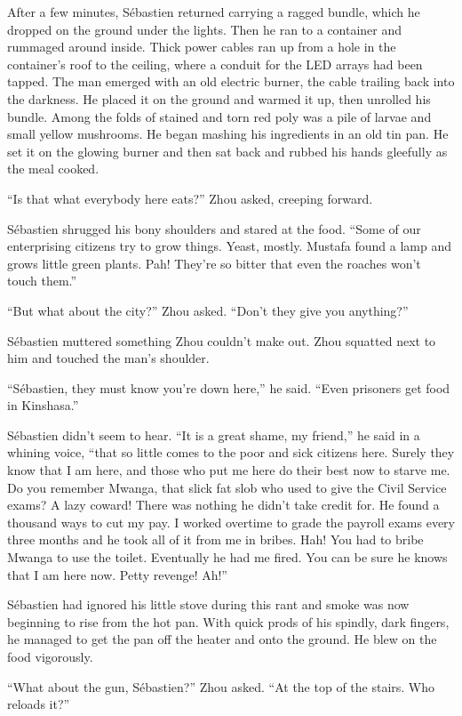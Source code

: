 \documentclass[10pt,a4paper]{article}
\begin{document}
After a few minutes, S\'{e}bastien returned carrying a ragged bundle,
which he dropped on the ground under the lights. Then he ran to a
container and rummaged around inside. Thick power cables ran up from
a hole in the container's roof to the ceiling, where a conduit for
the LED arrays had been tapped. The man emerged with an old electric
burner, the cable trailing back into the darkness. He placed it
on the ground and warmed it up, then unrolled his bundle. Among
the folds of stained and torn red poly was a pile of larvae and
small yellow mushrooms. He began mashing his ingredients in an
old tin pan. He set it on the glowing burner and then sat back
and rubbed his hands gleefully as the meal cooked.

``Is that what everybody here eats?'' Zhou asked, creeping forward.

S\'{e}bastien shrugged his bony shoulders and stared at
the food. ``Some of our enterprising citizens try to grow
things. Yeast, mostly. Mustafa found a lamp and grows little green
plants. Pah! They're so bitter that even the roaches won't touch
them.''

``But what about the city?'' Zhou asked. ``Don't they give you
anything?''

S\'{e}bastien muttered something Zhou couldn't make out. Zhou squatted
next to him and touched the man's shoulder.

``S\'{e}bastien, they must know you're down here,'' he said. ``Even
prisoners get food in Kinshasa.''

S\'{e}bastien didn't seem to hear. ``It is a great shame, my friend,''
he said in a whining voice, ``that so little comes to the poor and
sick citizens here. Surely they know that I am here, and those
who put me here do their best now to starve me. Do you remember
Mwanga, that slick fat slob who used to give the Civil Service
exams? A lazy coward! There was nothing he didn't take credit
for. He found a thousand ways to cut my pay. I worked overtime
to grade the payroll exams every three months and he took all of
it from me in bribes. Hah! You had to bribe Mwanga to use the
toilet. Eventually he had me fired. You can be sure he knows that
I am here now. Petty revenge! Ah!''

S\'{e}bastien had ignored his little stove during this rant and smoke
was now beginning to rise from the hot pan. With quick prods of
his spindly, dark fingers, he managed to get the pan off the heater
and onto the ground. He blew on the food vigorously.

``What about the gun, S\'{e}bastien?'' Zhou asked. ``At the top of the
stairs. Who reloads it?''
\end{document}
